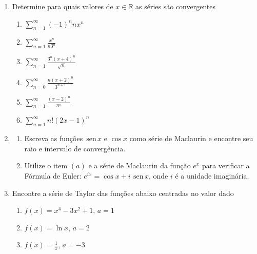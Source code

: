 \documentclass[a4paper,5pt]{amsbook}
\renewcommand{\sin}{\,\mbox{sen}\,}
\newcommand{\ds}{\displaystyle}
\begin{document}
\vspace{1cm}
\begin{enumerate}
    \setlength\itemsep{0.5cm}
    \item Determine para quais valores de $x\in\mathbb{R}$ as s\'eries s\~ao
    convergentes
    	\begin{enumerate}
    		\item $\ds\sum_{n=1}^\infty (-1)^n nx^n$
    		\item $\ds\sum_{n=1}^\infty \frac{x^n}{n3^n}$
    		\item $\ds\sum_{n=1}^\infty \frac{3^n(x+4)^n}{\sqrt{n}}$
    		\item $\ds\sum_{n=0}^\infty \frac{n(x+2)^n}{3^{n+1}}$
    		\item $\ds\sum_{n=1}^\infty \frac{(x-2)^n}{n^n}$
    		\item $\ds\sum_{n=1}^\infty n!(2x-1)^n$
    	\end{enumerate}
    
    \item
    	\begin{enumerate}
            \item Escreva as fun\c{c}\~oes $\sin x$ e $\cos x$ como s\'erie de
            Maclaurin e encontre seu raio e intervalo de converg\^encia.
            \item Utilize o item $(a)$ e a s\'erie de Maclaurin da fun\c{c}\~ao $e^x$
            para verificar a F\'ormula de Euler: $e^{ix} = \cos x + i\ \sin x$, onde
            $i$ \'e a unidade imagin\'aria.
    	\end{enumerate}
    
    \item Encontre a s\'erie de Taylor das fun\c{c}\~oes abaixo centradas no valor dado
    	\begin{enumerate}
    		\item $f(x) = x^4 - 3x^2 + 1$, $a = 1$
    		\item $f(x) = \ln x$, $a = 2$
            \item $f(x) = \ds\frac{1}{x}$, $a=-3$
    	\end{enumerate}
\end{enumerate}
\end{document}
